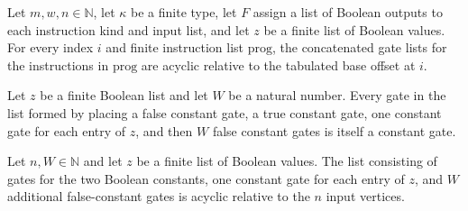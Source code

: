 \begin{theorem}
\label{BoolCircuit.gatesAcyclic_tabProgGates}
\leanok
{}
Let $m,w,n\in\mathbb{N}$, let $\kappa$ be a finite type, let $F$ assign a list of
Boolean outputs to each instruction kind and input list, and let $z$ be a finite list of
Boolean values. For every index $i$ and finite instruction list $\mathrm{prog}$, the
concatenated gate lists for the instructions in $\mathrm{prog}$ are acyclic relative to
the tabulated base offset at $i$.
\end{theorem}

\begin{theorem}
\label{BoolCircuit.mem_tabPre}
\leanok
{}
Let $z$ be a finite Boolean list and let $W$ be a natural number. Every gate in the list
formed by placing a false constant gate, a true constant gate, one constant gate for
each entry of $z$, and then $W$ false constant gates is itself a constant gate.
\end{theorem}

\begin{theorem}
\label{BoolCircuit.gatesAcyclic_tabPre}
\leanok
{}
Let $n,W\in\mathbb{N}$ and let $z$ be a finite list of Boolean values. The list
consisting of gates for the two Boolean constants, one constant gate for each entry of
$z$, and $W$ additional false-constant gates is acyclic relative to the $n$ input
vertices.
\end{theorem}

